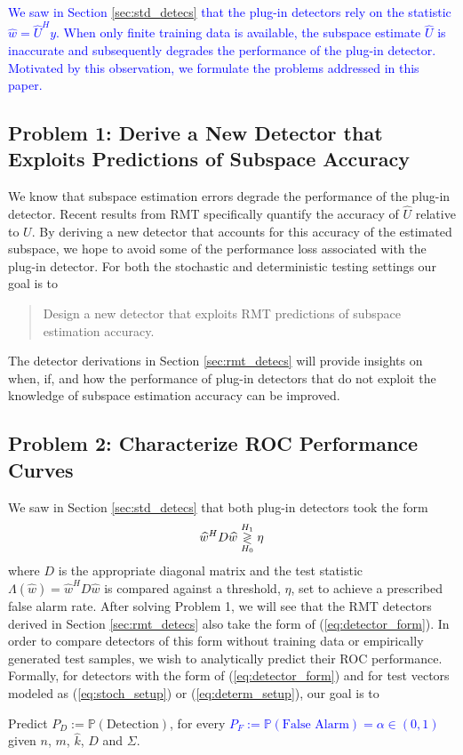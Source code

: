 \textcolor{blue}{We saw in Section \ref{sec:std_detecs} that the plug-in detectors rely on the statistic $\widehat{w}=\widehat{U}^Hy$. When only finite training data is available, the subspace estimate $\widehat{U}$ is inaccurate and subsequently degrades the performance of the plug-in detector. Motivated by this observation, we formulate the problems addressed in this paper.}

\subsection{Problem 1: Derive a New Detector that Exploits Predictions of Subspace Accuracy}\label{sec:ps_prob2}

We know that subspace estimation errors degrade the performance of the plug-in detector. Recent results from RMT specifically quantify the accuracy of $\widehat{U}$ relative to $U$. By deriving a new detector that accounts for this accuracy of the estimated subspace, we hope to avoid some of the performance loss associated with the plug-in detector. For both the stochastic and deterministic testing settings our goal is to 
\begin{quote}
Design a new detector that exploits RMT predictions of subspace estimation accuracy.
\end{quote}
The detector derivations in Section \ref{sec:rmt_detecs} will provide insights on when, if, and how the performance of plug-in detectors that do not exploit the knowledge of subspace estimation accuracy can be improved.
 
\subsection{Problem 2: Characterize ROC Performance Curves}\label{sec:problem 1}

We saw in Section \ref{sec:std_detecs} that both plug-in detectors took the form
\begin{equation}\label{eq:detector_form}
\widehat{w}^HD\widehat{w}\detgtrless\eta
\end{equation}
where $D$ is the appropriate diagonal matrix and the test statistic $\Lambda(\widehat{w})=\widehat{w}^HD\widehat{w}$ is compared against a threshold, $\eta$, set to achieve a prescribed false alarm rate. After solving Problem 1, we will see that the RMT detectors derived in Section \ref{sec:rmt_detecs} also take the form of (\ref{eq:detector_form}). In order to compare detectors of this form without training data or empirically generated test samples, we wish to analytically predict their ROC performance. Formally, for detectors with the form of (\ref{eq:detector_form}) and for test vectors modeled as (\ref{eq:stoch_setup}) or (\ref{eq:determ_setup}), our goal is to
\begin{center}
Predict $P_D:=\mathbb{P}(\text{Detection})$, for every \textcolor{blue}{$P_F:=\mathbb{P}(\text{False Alarm})=\alpha \in (0,1)$} given $n$, $m$, $\widehat{k}$, $D$ and $\Sigma$.
\end{center}

